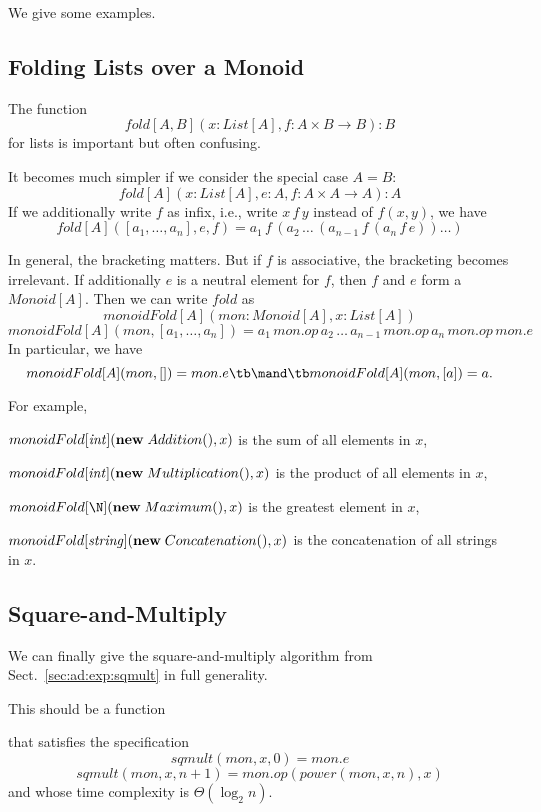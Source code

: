 We give some examples.

\subsection{Folding Lists over a Monoid}\label{sec:ad:monoidfold}

The function \[fold[A,B](x:List[A], f: A\times B\to B): B\] for lists is important but often confusing.

It becomes much simpler if we consider the special case $A=B$:
\[fold[A](x:List[A], e: A, f: A\times A\to A): A\]
If we additionally write $f$ as infix, i.e., write $x\,f\,y$ instead of $f(x,y)$, we have
\[fold[A]([a_1,\ldots,a_n],e,f)=a_1\,f\,(a_2\,\ldots\,(a_{n-1}\,f\,(a_n\,f\, e))\ldots)\]

In general, the bracketing matters.
But if $f$ is associative, the bracketing becomes irrelevant.
If additionally $e$ is a neutral element for $f$, then $f$ and $e$ form a $Monoid[A]$.
Then we can write $fold$ as
\[monoidFold[A](mon:Monoid[A], x:List[A])\]
\[monoidFold[A](mon, [a_1,\ldots,a_n])=a_1\,mon.op\,a_2\,\ldots\,a_{n-1}\,mon.op\,a_n\,mon.op\, mon.e\]
In particular, we have
\[monoidFold[A](mon, [])=mon.e \tb\mand\tb monoidFold[A](mon, [a])=a.\]

For example,
\begin{compactitem}
\item $monoidFold[\mathit{int}]({\rm \bf new}\; Addition(), x)$ is the sum of all elements in $x$,
\item $monoidFold[\mathit{int}]({\rm \bf new}\; Multiplication(), x)$ is the product of all elements in $x$,
\item $monoidFold[\N](\anew{Maximum}{}, x)$ is the greatest element in $x$,
\item $monoidFold[\mathit{string}]({\rm \bf new}\; Concatenation(), x)$ is the concatenation of all strings in $x$.
\end{compactitem}

\subsection{Square-and-Multiply}

We can finally give the square-and-multiply algorithm from Sect.~\ref{sec:ad:exp:sqmult} in full generality.

This should be a function
\begin{acode}
\end{acode}
that satisfies the specification
\[sqmult(mon, x, 0)=mon.e\]
\[sqmult(mon, x, n+1)=mon.op(power(mon, x, n), x)\]
and whose time complexity is $\Theta(\log_2 n)$.

